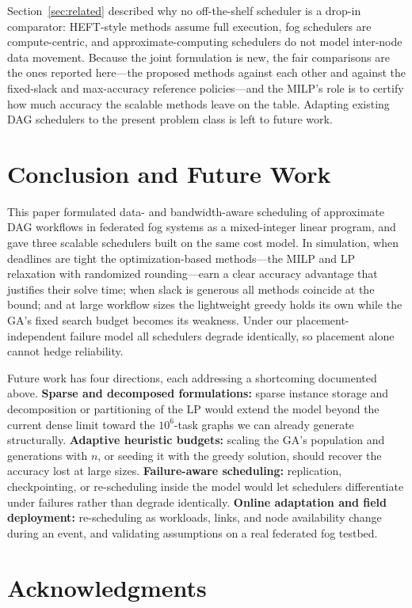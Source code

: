\documentclass[conference]{IEEEtran}
\begin{document}
Section~\ref{sec:related} described why no off-the-shelf scheduler is a drop-in comparator: HEFT-style methods assume full execution, fog schedulers are compute-centric, and approximate-computing schedulers do not model inter-node data movement. Because the joint formulation is new, the fair comparisons are the ones reported here---the proposed methods against each other and against the fixed-slack and max-accuracy reference policies---and the MILP's role is to certify how much accuracy the scalable methods leave on the table. Adapting existing DAG schedulers to the present problem class is left to future work.

\section{Conclusion and Future Work}

This paper formulated data- and bandwidth-aware scheduling of approximate DAG workflows in federated fog systems as a mixed-integer linear program, and gave three scalable schedulers built on the same cost model. In simulation, when deadlines are tight the optimization-based methods---the MILP and LP relaxation with randomized rounding---earn a clear accuracy advantage that justifies their solve time; when slack is generous all methods coincide at the bound; and at large workflow sizes the lightweight greedy holds its own while the GA's fixed search budget becomes its weakness. Under our placement-independent failure model all schedulers degrade identically, so placement alone cannot hedge reliability.

Future work has four directions, each addressing a shortcoming documented above. \textbf{Sparse and decomposed formulations:} sparse instance storage and decomposition or partitioning of the LP would extend the model beyond the current dense limit toward the $10^6$-task graphs we can already generate structurally. \textbf{Adaptive heuristic budgets:} scaling the GA's population and generations with $n$, or seeding it with the greedy solution, should recover the accuracy lost at large sizes. \textbf{Failure-aware scheduling:} replication, checkpointing, or re-scheduling inside the model would let schedulers differentiate under failures rather than degrade identically. \textbf{Online adaptation and field deployment:} re-scheduling as workloads, links, and node availability change during an event, and validating assumptions on a real federated fog testbed.

\section*{Acknowledgments}
\end{document}
